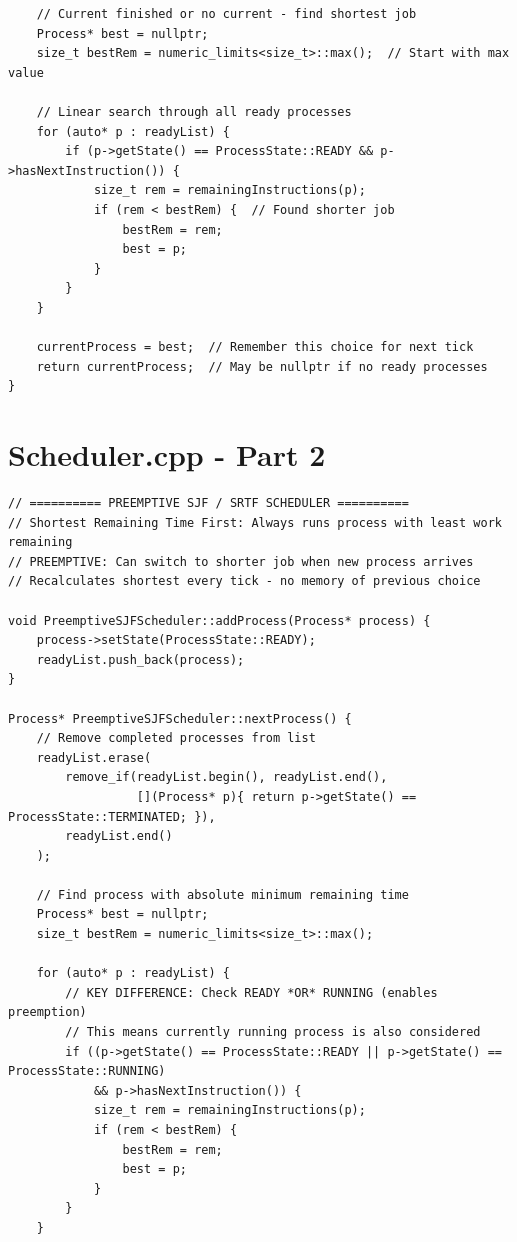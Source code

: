 \documentclass[a4paper,10pt,oneside]{article}
\begin{document}
\begin{multicols*}{\COLS}
\begin{lstlisting}
    // Current finished or no current - find shortest job
    Process* best = nullptr;
    size_t bestRem = numeric_limits<size_t>::max();  // Start with max value
    
    // Linear search through all ready processes
    for (auto* p : readyList) {
        if (p->getState() == ProcessState::READY && p->hasNextInstruction()) {
            size_t rem = remainingInstructions(p);
            if (rem < bestRem) {  // Found shorter job
                bestRem = rem;
                best = p;
            }
        }
    }

    currentProcess = best;  // Remember this choice for next tick
    return currentProcess;  // May be nullptr if no ready processes
}
\end{lstlisting}

\section*{Scheduler.cpp - Part 2}
\begin{lstlisting}
// ========== PREEMPTIVE SJF / SRTF SCHEDULER ==========
// Shortest Remaining Time First: Always runs process with least work remaining
// PREEMPTIVE: Can switch to shorter job when new process arrives
// Recalculates shortest every tick - no memory of previous choice

void PreemptiveSJFScheduler::addProcess(Process* process) {
    process->setState(ProcessState::READY);
    readyList.push_back(process);
}

Process* PreemptiveSJFScheduler::nextProcess() {
    // Remove completed processes from list
    readyList.erase(
        remove_if(readyList.begin(), readyList.end(),
                  [](Process* p){ return p->getState() == ProcessState::TERMINATED; }),
        readyList.end()
    );

    // Find process with absolute minimum remaining time
    Process* best = nullptr;
    size_t bestRem = numeric_limits<size_t>::max();
    
    for (auto* p : readyList) {
        // KEY DIFFERENCE: Check READY *OR* RUNNING (enables preemption)
        // This means currently running process is also considered
        if ((p->getState() == ProcessState::READY || p->getState() == ProcessState::RUNNING) 
            && p->hasNextInstruction()) {
            size_t rem = remainingInstructions(p);
            if (rem < bestRem) {
                bestRem = rem;
                best = p;
            }
        }
    }


\end{lstlisting}
\end{multicols*}
\end{document}
